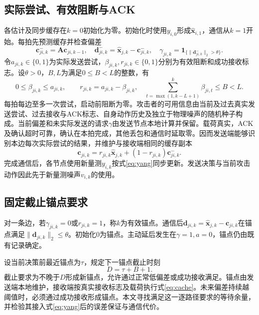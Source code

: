\documentclass[UTF8,a4paper,zihao=5,fontset=windows]{ctexart}
\newcommand{\ind}{\mathbf 1}
\begin{document}
\subsection{实际尝试、有效阻断与ACK}
各估计及同步缓存在$k=0$初始化为零。初始化时使用$y_{i,0}$形成$\hat {\bm{x}}_{i,1}$，通信从$k=1$开始。每拍先预测缓存并检查偏差
\begin{equation}
{\bm{c}}^-_{ji,k}={\bm{A}}{\bm{c}}_{ji,k-1},\quad
{\bm{d}}^-_{ji,k}=\hat {\bm{x}}_{j,k}-{\bm{c}}^-_{ji,k},\quad
\gamma_{ji,k}=\ind_{\{\|{\bm{d}}^-_{ji,k}\|_2>\theta\}}.
\label{eq:trigger}
\end{equation}
令$a_{ji,k}\in\{0,1\}$为实际发送尝试，$\beta_{ji,k},r_{ji,k}\in\{0,1\}$分别为有效阻断和成功接收标志。设$\theta>0$，$B,L$为满足$0\le B<L$的整数，有
\begin{equation}
0\le\beta_{ji,k}\le a_{ji,k},\qquad r_{ji,k}=a_{ji,k}-\beta_{ji,k},
\quad
\sum_{t=\max(1,k-L+1)}^k\beta_{ji,t}\le B<L.
\label{eq:budget}
\end{equation}
每拍每边至多一次尝试，启动前阻断为零。攻击者的可用信息由当前及过去真实发送尝试、过去接收与ACK标志、自身动作历史及独立于物理噪声的随机种子构成。当前偏差和未实际发送的请求$\gamma$由发送节点本地计算并保留。载荷真实，ACK及确认超时可靠，确认在本拍完成，其他丢包和通信时延取零。因而发送端能够识别本边每次实际尝试的结果，并维护与接收端相同的缓存副本
\begin{equation}
{\bm{c}}_{ji,k}=r_{ji,k}\hat {\bm{x}}_{j,k}+(1-r_{ji,k}){\bm{c}}^-_{ji,k}.
\label{eq:cache}
\end{equation}
完成通信后，各节点使用新量测$y_{i,k}$按式\eqref{eq:yang}同步更新。发送决策与当前攻击动作因此先于新量测噪声$v_{i,k}$的使用。

\subsection{固定截止锚点要求}
对一条边，若$\gamma_{ji,k}=0$或$r_{ji,k}=1$，称$k$为有效锚点。通信后${\bm{d}}_{ji,k}=\hat {\bm{x}}_{j,k}-{\bm{c}}_{ji,k}$在锚点满足$\|{\bm{d}}_{ji,k}\|_2\le\theta$。初始化$0$为锚点。主动延后发生在$\gamma=1,a=0$，锚点仍由既有记录确定。

设当前决策前最近锚点为$\tau$，规定下一锚点截止时刻
\begin{equation}
D=\tau+B+1.
\label{eq:deadline}
\end{equation}
截止要求为不晚于$D$形成新锚点，允许通过正常低偏差或成功接收满足。锚点由发送端本地维护，接收端按真实接收标志及载荷执行式\eqref{eq:cache}。未来偏差持续越阈值时，必须通过成功接收形成锚点。本文寻找满足这一逐路径要求的等待余量，并检验其接入式\eqref{eq:yang}后的误差保证与通信代价。
\end{document}
